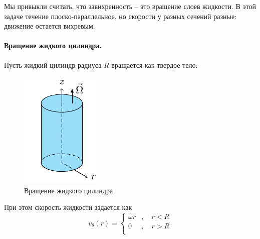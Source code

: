 Мы привыкли считать, что завихренность  -- это вращение слоев жидкости. В этой задаче течение плоско-параллельное, но скорости у разных сечений разные: движение остается вихревым.

\paragraph{Вращение жидкого цилиндра.} Пусть  жидкий цилиндр радиуса $R$ вращается как твердое тело:
\begin{figure}[h!]
    \centering
    \includegraphics[scale=1.5]{img/gcyl}
    \caption{Вращение жидкого цилиндра}
    \label{fig:gcyl}
\end{figure}
При этом скорость жидкости задается как
\begin{equation}
	v_\theta(r)=\left\{
	\begin{aligned}
		\omega r&, \quad r<R\\
		0&, \quad r>R\\
	\end{aligned}
	\right.
\end{equation}

